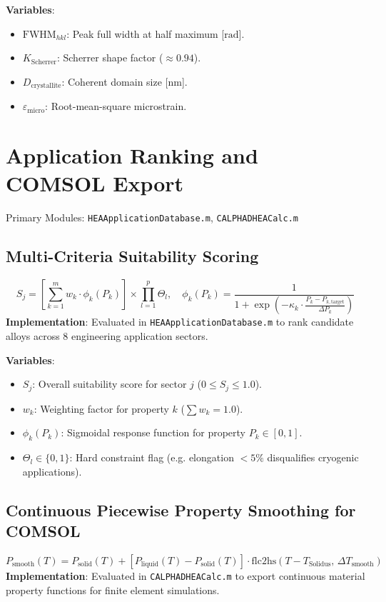 \documentclass[11pt,a4paper]{article}
\begin{document}
\noindent\textbf{Variables}:
\begin{itemize}
  \item $\text{FWHM}_{hkl}$: Peak full width at half maximum [$\text{rad}$].
  \item $K_{\text{Scherrer}}$: Scherrer shape factor ($\approx 0.94$).
  \item $D_{\text{crystallite}}$: Coherent domain size [$\text{nm}$].
  \item $\varepsilon_{\text{micro}}$: Root-mean-square microstrain.
\end{itemize}

\section{Application Ranking and COMSOL Export}
Primary Modules: \texttt{HEAApplicationDatabase.m}, \texttt{CALPHADHEACalc.m}

\subsection{Multi-Criteria Suitability Scoring}
\begin{equation}
S_j = \left[ \sum_{k=1}^m w_k \cdot \phi_k(P_k) \right] \times \prod_{l=1}^p \Theta_l, \quad \phi_k(P_k) = \frac{1}{1 + \exp\left(-\kappa_k \cdot \frac{P_k - P_{k, \text{target}}}{\Delta P_k}\right)}
\end{equation}
\textbf{Implementation}: Evaluated in \texttt{HEAApplicationDatabase.m} to rank candidate alloys across 8 engineering application sectors.

\noindent\textbf{Variables}:
\begin{itemize}
  \item $S_j$: Overall suitability score for sector $j$ ($0 \le S_j \le 1.0$).
  \item $w_k$: Weighting factor for property $k$ ($\sum w_k = 1.0$).
  \item $\phi_k(P_k)$: Sigmoidal response function for property $P_k \in [0, 1]$.
  \item $\Theta_l \in \{0, 1\}$: Hard constraint flag (e.g. elongation $< 5\%$ disqualifies cryogenic applications).
\end{itemize}

\subsection{Continuous Piecewise Property Smoothing for COMSOL}
\begin{equation}
P_{\text{smooth}}(T) = P_{\text{solid}}(T) + \left[P_{\text{liquid}}(T) - P_{\text{solid}}(T)\right] \cdot \text{flc2hs}\left(T - T_{\text{Solidus}}, \, \Delta T_{\text{smooth}}\right)
\end{equation}
\textbf{Implementation}: Evaluated in \texttt{CALPHADHEACalc.m} to export continuous material property functions for finite element simulations.
\end{document}
